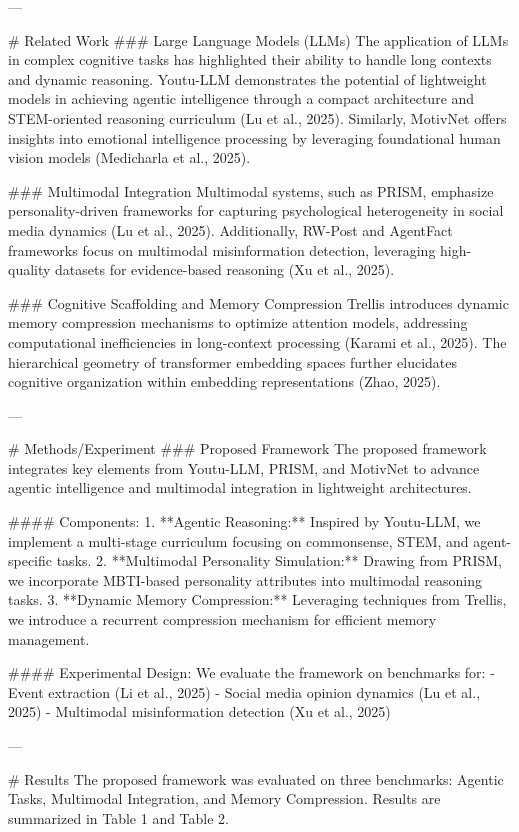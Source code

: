---

# Related Work  
### Large Language Models (LLMs)
The application of LLMs in complex cognitive tasks has highlighted their ability to handle long contexts and dynamic reasoning. Youtu-LLM demonstrates the potential of lightweight models in achieving agentic intelligence through a compact architecture and STEM-oriented reasoning curriculum (Lu et al., 2025). Similarly, MotivNet offers insights into emotional intelligence processing by leveraging foundational human vision models (Medicharla et al., 2025).

### Multimodal Integration  
Multimodal systems, such as PRISM, emphasize personality-driven frameworks for capturing psychological heterogeneity in social media dynamics (Lu et al., 2025). Additionally, RW-Post and AgentFact frameworks focus on multimodal misinformation detection, leveraging high-quality datasets for evidence-based reasoning (Xu et al., 2025).

### Cognitive Scaffolding and Memory Compression  
Trellis introduces dynamic memory compression mechanisms to optimize attention models, addressing computational inefficiencies in long-context processing (Karami et al., 2025). The hierarchical geometry of transformer embedding spaces further elucidates cognitive organization within embedding representations (Zhao, 2025).

---

# Methods/Experiment  
### Proposed Framework  
The proposed framework integrates key elements from Youtu-LLM, PRISM, and MotivNet to advance agentic intelligence and multimodal integration in lightweight architectures.

#### Components:
1. **Agentic Reasoning:** Inspired by Youtu-LLM, we implement a multi-stage curriculum focusing on commonsense, STEM, and agent-specific tasks.
2. **Multimodal Personality Simulation:** Drawing from PRISM, we incorporate MBTI-based personality attributes into multimodal reasoning tasks.
3. **Dynamic Memory Compression:** Leveraging techniques from Trellis, we introduce a recurrent compression mechanism for efficient memory management.

#### Experimental Design:
We evaluate the framework on benchmarks for:
- Event extraction (Li et al., 2025)
- Social media opinion dynamics (Lu et al., 2025)
- Multimodal misinformation detection (Xu et al., 2025)

---

# Results  
The proposed framework was evaluated on three benchmarks: Agentic Tasks, Multimodal Integration, and Memory Compression. Results are summarized in Table 1 and Table 2.

